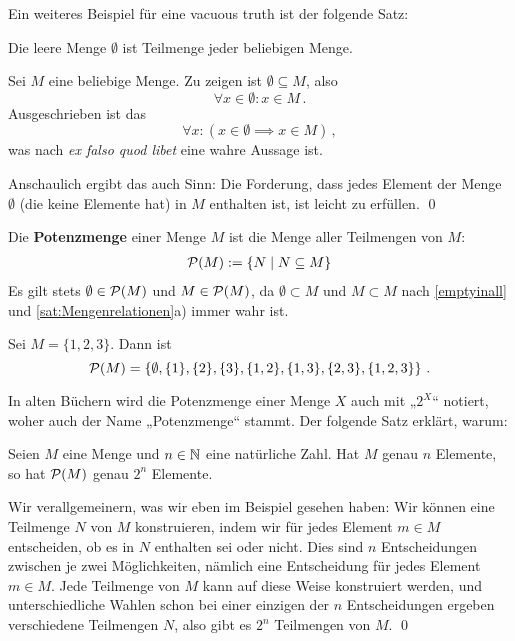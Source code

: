 Ein weiteres Beispiel für eine vacuous truth ist der folgende Satz:

\begin{sat}\label{emptyinall}
	Die leere Menge $\emptyset$ ist Teilmenge jeder beliebigen Menge.
\end{sat}

\begin{bew}
	Sei $M$ eine beliebige Menge. Zu zeigen ist $\emptyset\subseteq M$, also
		\[ \forall x\in\emptyset: x\in M \,.\]
	Ausgeschrieben ist das 
		\[ \forall x: \left(x\in \emptyset\implies x\in M\right) \,, \]
	was nach \textit{ex falso quod libet} eine wahre Aussage ist. 
	
	Anschaulich ergibt das auch Sinn: Die Forderung, dass jedes Element der Menge $\emptyset$ (die keine Elemente hat) in $M$ enthalten ist, ist leicht zu erfüllen. \qed
\end{bew}



\begin{de} \label{powerset}
	Die \textbf{Potenzmenge} einer Menge $M$ ist die Menge aller Teilmengen von $M$:
	\begin{align*}
		{\mathcal P}(M) := \{N \mid N \subseteq M\}
	\end{align*}
	Es gilt stets $\emptyset \in {\mathcal P}(M)$ und $M \in {\mathcal P}(M)$, da $\emptyset \subset M$ und $M \subset M$ nach \cref{emptyinall} und \cref{sat:Mengenrelationen}a) immer wahr ist.
\end{de}

\begin{bsp}
	Sei $M=\{1,2,3\}$. Dann ist
		\[ {\mathcal P}(M)=\left\{\emptyset,\{1\},\{2\},\{3\},\{1,2\},\{1,3\},\{2,3\},\{1,2,3\}\right\}\,. \]
\end{bsp}


In alten Büchern wird die Potenzmenge einer Menge $X$ auch mit „$2^X$“ notiert, woher auch der Name „Potenzmenge“ stammt. Der folgende Satz erklärt, warum:
\begin{sat}
	Seien $M$ eine Menge und $n\in{\mathbb N}$ eine natürliche Zahl. Hat $M$ genau $n$ Elemente, so hat ${\mathcal P}(M)$ genau $2^n$ Elemente.
\end{sat}

\begin{bew}
	Wir verallgemeinern, was wir eben im Beispiel gesehen haben: Wir können eine Teilmenge $N$ von $M$ konstruieren, indem wir für jedes Element $m\in M$ entscheiden, ob es in $N$ enthalten sei oder nicht. Dies sind $n$ Entscheidungen zwischen je zwei Möglichkeiten, nämlich eine Entscheidung für jedes Element $m\in M$. Jede Teilmenge von $M$ kann auf diese Weise konstruiert werden, und unterschiedliche Wahlen schon bei einer einzigen der $n$ Entscheidungen ergeben verschiedene Teilmengen $N$, also gibt es $2^n$ Teilmengen von $M$. \qed
\end{bew}

